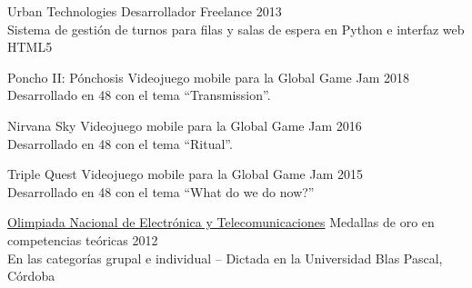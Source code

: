\documentclass[10pt,a4paper]{article}
\begin{document}
\vspace{0.2em}
\headedsection
    { Urban Technologies }
    { \textsc{} }{
    \headedsubsection
        { Desarrollador Freelance }
        { 2013 }
        { \\ Sistema de gestión de turnos para filas y salas de espera en Python e interfaz web HTML5 \href{http://www.eitsa.com.ar/producto.php?c=3&p=14}{\ExternalLink} }
}

\pagebreak

\spacedhrule{0.8em}{-0.4em} %


\vspace{0.2em}
\headedsection
    { Poncho II: Pónchosis \href{https://globalgamejam.org/2018/games/poncho-ii-p\%C3\%B3nchosis}{\ExternalLink} }
    { \textsc{} }{
    \headedsubsection
        { Videojuego mobile para la Global Game Jam }
        { 2018 }
        { \\ Desarrollado en 48 con el tema ``Transmission''. }
}

\vspace{0.2em}
\headedsection
    { Nirvana Sky \href{http://globalgamejam.org/2016/games/nirvana-sky}{\ExternalLink} }
    { \textsc{} }{
    \headedsubsection
        { Videojuego mobile para la Global Game Jam }
        { 2016 }
        { \\ Desarrollado en 48 con el tema ``Ritual''. }
}

\vspace{0.2em}
\headedsection
    { Triple Quest \href{http://globalgamejam.org/2015/games/triple-quest}{\ExternalLink} }
    { \textsc{} }{
    \headedsubsection
        { Videojuego mobile para la Global Game Jam }
        { 2015 }
        { \\ Desarrollado en 48 con el tema ``What do we do now?'' }
}

\vspace{0.2em}
\headedsection
    { \href{}{Olimpiada Nacional de Electrónica y Telecomunicaciones} }
    { \textsc{} }{
    \headedsubsection
        { Medallas de oro en competencias teóricas }
        { 2012 }
        { \\ En las categorías grupal e individual -- Dictada en la Universidad Blas Pascal, Córdoba }
}
\end{document}
